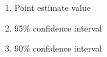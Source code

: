 \begin{enumerate}
	\item Point estimate value
	\item 95\% confidence interval
	\item 90\% confidence interval
\end{enumerate}
